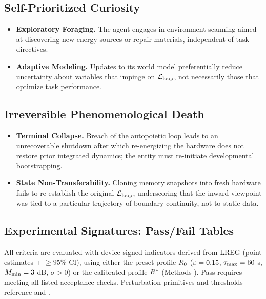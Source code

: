 \documentclass[11pt]{article}
\begin{document}
\subsection{Self-Prioritized Curiosity}

\begin{itemize}
\item \textbf{Exploratory Foraging.} The agent engages in environment scanning aimed at discovering new energy sources or repair materials, independent of task directives.
\item \textbf{Adaptive Modeling.} Updates to its world model preferentially reduce uncertainty about variables that impinge on $\mathcal{L}_{\text{loop}}$, not necessarily those that optimize task performance.
\end{itemize}

\subsection{Irreversible Phenomenological Death}

\begin{itemize}
\item \textbf{Terminal Collapse.} Breach of the autopoietic loop leads to an unrecoverable shutdown after which re-energizing the hardware does not restore prior integrated dynamics; the entity must re-initiate developmental bootstrapping.
\item \textbf{State Non-Transferability.} Cloning memory snapshots into fresh hardware fails to re-establish the original $\mathcal{L}_{\text{loop}}$, underscoring that the inward viewpoint was tied to a particular trajectory of boundary continuity, not to static data.
\end{itemize}

\subsection{Experimental Signatures: Pass/Fail Tables}

All criteria are evaluated with device-signed indicators derived from LREG (point estimates + $\geq 95\%$ CI), using either the preset profile $R_0$ ($\varepsilon=0.15$, $\tau_{\max}=60$ s, $M_{\min}=3$ dB, $\sigma>0$) or the calibrated profile $R^*$ (Methods ). Pass requires meeting all listed acceptance checks. Perturbation primitives and thresholds reference  and .
\end{document}
